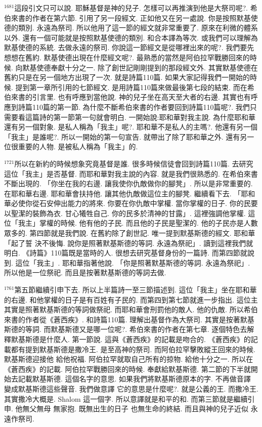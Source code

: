 \documentclass{book}
\begin{document}
$^{1681}$這段引文只可以說.
耶穌基督是神的兒子.
怎樣可以再推演到他是大祭司呢?.
希伯來書的作者在第六節.
引用了另一段經文.
正如他又在另一處說.
你是按照默基使德的類別.
永遠為祭司.
所以他用了這一節的經文就非常重要了.
原來在利微的體系以外.
還有一個可能就是按照默基使德的類別.
和合本譯為等次.
或我們可以理解為默基使德的系統.
去做永遠的祭司.
你說這一節經文是從哪裡出來的呢?.
我們要先想想在舊約.
默基使德出現在什麼經文呢?.
最熟悉的當然是阿伯拉罕戰勝回來的時候.
向默基使德奉獻十分之一.
除了創世記剛剛提到的那段經文外.
其實默基使德在舊約只是在另一個地方出現了一次.
就是詩篇110篇.
如果大家記得我們一開始的時候.
提到第一章所引用的七節經文.
是用詩篇110篇來做最後第七段的結束.
而在希伯來書的引言里.
也有呼應到當他說.
神的兒子坐在高天至大者的右邊.
其實也有呼應到詩篇110篇的第一節.
為什麼不斷希伯來書的作者要回到詩篇110篇呢?.
我們只需要看這篇詩的第一節第一句就會明白.
一開始說:耶和華對我主說.
為什麼耶和華還有另一個對象.
是私人稱為「我主」呢?.
耶和華不是私人的主嗎?.
他還有另一個「我主」是誰呢?.
所以一開始的第一句宣告.
就帶出了除了耶和華之外.
還有另一位很重要的人物.
是被私人稱為「我主」的.

$^{1721}$所以在新約的時候想象究竟基督是誰.
很多時候信徒會回到詩篇110篇.
去研究這位「我主」是否基督.
而耶和華對我主說的內容.
就是我們很熟悉的.
在希伯來書不斷出現的.
「你坐在我的右邊.
讓我使你仇敵做你的腳凳」.
所以是非常重要的.
在耶和華右邊.
耶和華會扶持他.
讓其他仇敵做這位主的腳凳.
繼續看下去.
「耶和華必使你從石安伸出能力的將來.
你要在你仇敵中掌權.
當你掌權的日子.
你的民要以聖潔的裝飾為衣.
甘心犧牲自己.
你的民多於清神的甘露」.
這裡強調他掌權.
這位「我主」掌權的時候.
他有他的子民.
而且他的子民是聖潔的.
他的子民亦是人數眾多的.
第四節就是我們說.
在舊約除了創世記.
唯一提到默基斯德的經文.
耶和華「起了誓 決不後悔.
說你是照著默基斯德的等詞.
永遠為祭祀」.
讀到這裡我們就明白.
《詩篇》110篇既是當時的人.
很想去研究基督身份的一篇詩.
而第四節就說到.
這位「我主」.
耶和華指著他說.
「你是照著默基斯德的等詞.
永遠為祭祀」.
所以他是一位祭祀.
而且是按著默基斯德的等詞去做.

$^{1761}$第五節繼續引申下去.
所以上半篇詩一至三節描述到.
這位「我主」坐在耶和華的右邊.
和他掌權的日子是有百姓有子民的.
而第四到第七節就進一步指出.
這位主其實是照著默基斯德的等詞做祭祀.
而耶和華會刑罰他的敵人.
他的仇敵.
所以希伯來書的作者從《蒼西疾》.
和詩篇110篇.
理解出基督作為大祭司.
其實是按著默基斯德的等詞.
而默基斯德又是哪一位呢?.
希伯來書的作者在第七章.
逐個特色去解釋默基斯德是什麼人.
第一節說.
這與《蒼西疾》的記載是吻合的.
《蒼西疾》的記載都有提到默基斯德是撒冷王.
是至高神的祭司.
而阿伯拉罕擊敗縱王回來的時候.
默基斯德迎接他 給他祝福.
阿伯拉罕就取自己所有的掠物.
給他十分之一.
所以在《蒼西疾》的記載.
阿伯拉罕戰勝回來的時候.
奉獻給默基斯德.
第二節的下半就開始去記載默基斯德.
這個名字的意思.
如果我們將默基斯德原本的字.
不再做音譯 變成默基斯德這些聲音.
我們做意譯 它的意思是什麼呢?.
就是公義的王.
而撒冷王.
其實撒冷大概是.
Shalom 這一個字.
所以意譯就是和平的和.
而第三節就是繼續引申.
他無父無母 無家抱.
既無出生的日子 也無生命的終結.
而且與神的兒子近似 永遠作祭司.
\end{document}
